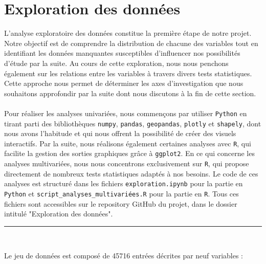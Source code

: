 \documentclass[12pt]{article}
\begin{document}
\section{Exploration des données}
L'analyse exploratoire des données constitue la première étape de notre projet. Notre objectif est de comprendre la distribution de chacune des variables tout en identifiant les données manquantes susceptibles d'influencer nos possibilités d'étude par la suite. Au cours de cette exploration, nous nous penchons également sur les relations entre les variables à travers divers tests statistiques. Cette approche nous permet de déterminer les axes d'investigation que nous souhaitons approfondir par la suite dont nous discutons à la fin de cette section.\\
\\
Pour réaliser les analyses univariées, nous commençons par utiliser \texttt{Python} en tirant parti des bibliothèques \texttt{numpy}, \texttt{pandas}, \texttt{geopandas}, \texttt{plotly} et \texttt{shapely}, dont nous avons l'habitude et qui nous offrent la possibilité de créer des visuels interactifs. Par la suite, nous réalisons également certaines analyses avec \texttt{R}, qui facilite la gestion des sorties graphiques grâce à \texttt{ggplot2}. En ce qui concerne les analyses multivariées, nous nous concentrons exclusivement sur \texttt{R}, qui propose directement de nombreux tests statistiques adaptés à nos besoins. Le code de ces analyses est structuré dans les fichiers \texttt{exploration.ipynb} pour la partie en \texttt{Python} et \texttt{script\_analyses\_multivariées.R} pour la partie en \texttt{R}. Tous ces fichiers sont accessibles sur le repository GitHub du projet, dans le dossier intitulé "Exploration des données".\\
\begin{center}
 \rule{0.5\linewidth}{0.5pt}\\
 \end{center}
\vspace{0.3cm}
Le jeu de données est composé de 45716 entrées décrites par neuf variables :
\end{document}
